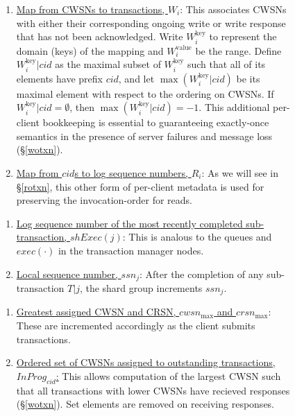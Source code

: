 \documentclass{article}
\begin{document}
\begin{figure}[H]
\begin{tcolorbox}[title= On \textbf{transaction manager node} $i$, enhanced, width=1.05\textwidth, left skip=-0.5cm, colback=black!4!white]
\begin{enumerate}[itemsep=1pt]
\item \underline{Map from CWSNs to transactions, $W_i$}: This associates CWSNs with either their corresponding ongoing write or write response that has not been acknowledged. Write $W_i^{\text{key}}$ to represent the domain (keys) of the mapping and $W_i^{\text{value}}$ be the range. Define $W_i^{\text{key}}|cid$ as the maximal subset of $W_i^{\text{key}}$ such that all of its elements have prefix $cid$, and let $\max(W_i^{\text{key}}|cid)$ be its maximal element with respect to the ordering on CWSNs. If $W_i^{\text{key}}|cid = \emptyset$, then $\max(W_i^{\text{key}}|cid) = -1$. This additional per-client bookkeeping is essential to guaranteeing exactly-once semantics in the presence of server failures and message loss (\S \ref{wotxn}).
\item \underline{Map from $cid$s to log sequence numbers, $R_i$}: As we will see in \S \ref{rotxn}, this other form of per-client metadata is used for preserving the invocation-order for reads. 
\end{enumerate}
\end{tcolorbox}
\begin{tcolorbox}[title= On \textbf{shard group} $j$, enhanced,width=1.05\textwidth, left skip=-0.5cm, colback=black!4!white]
\begin{enumerate}[itemsep=1pt]
\item \underline{Log sequence number of the most recently completed sub-transaction, $shExec(j)$}: This is analous to the queues and $exec(\cdot)$ in the transaction manager nodes. 
\item \underline{Local sequence number, $ssn_j$}: After the completion of any sub-transaction $T|j$, the shard group increments $ssn_j$. 
\end{enumerate}
\end{tcolorbox}
\begin{tcolorbox}[title= On \textbf{client} $cid$, enhanced,width=1.05\textwidth, left skip=-0.5cm, colback=black!4!white]
  \begin{enumerate}[itemsep=1pt]
  \item \underline{Greatest assigned CWSN and CRSN, $cwsn_{\max}$ and $crsn_{\max}$}: These are incremented accordingly as the client submits transactions.
  \item \underline{Ordered set of CWSNs assigned to outstanding transactions, $InProg_{cid}$:} This allows computation of the largest CWSN such that all transactions with lower CWSNs have recieved responses (\S \ref{wotxn}). Set elements are removed on receiving responses. 

\end{enumerate}
\end{tcolorbox}
\end{figure}
\end{document}
